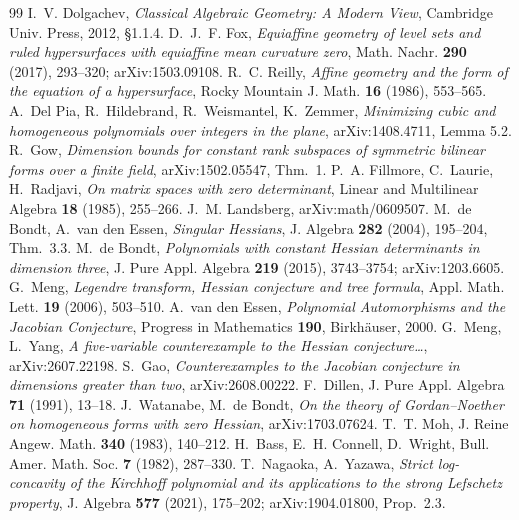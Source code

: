 \documentclass[11pt]{article}
\theoremstyle{plain}
\theoremstyle{definition}
\begin{document}
\begin{thebibliography}{99}
 I.~V. Dolgachev, \emph{Classical Algebraic Geometry: A
Modern View}, Cambridge Univ. Press, 2012, \S1.1.4.
 D.~J.~F. Fox, \emph{Equiaffine geometry of level sets and
ruled hypersurfaces with equiaffine mean curvature zero}, Math. Nachr.
\textbf{290} (2017), 293--320; arXiv:1503.09108.
 R.~C. Reilly, \emph{Affine geometry and the form of the
equation of a hypersurface}, Rocky Mountain J. Math. \textbf{16} (1986),
553--565.
 A.~Del Pia, R.~Hildebrand, R.~Weismantel, K.~Zemmer,
\emph{Minimizing cubic and homogeneous polynomials over integers in the
plane}, arXiv:1408.4711, Lemma 5.2.
 R.~Gow, \emph{Dimension bounds for constant rank subspaces of
symmetric bilinear forms over a finite field}, arXiv:1502.05547, Thm.~1.
 P.~A. Fillmore, C.~Laurie, H.~Radjavi, \emph{On matrix spaces
with zero determinant}, Linear and Multilinear Algebra \textbf{18} (1985),
255--266.
 J.~M. Landsberg, arXiv:math/0609507.
 M.~de Bondt, A.~van den Essen, \emph{Singular
Hessians}, J. Algebra \textbf{282} (2004), 195--204, Thm.~3.3.
 M.~de Bondt, \emph{Polynomials with constant Hessian
determinants in dimension three}, J. Pure Appl. Algebra \textbf{219}
(2015), 3743--3754; arXiv:1203.6605.
 G.~Meng, \emph{Legendre transform, Hessian conjecture and
tree formula}, Appl. Math. Lett. \textbf{19} (2006), 503--510.
 A.~van den Essen, \emph{Polynomial Automorphisms
and the Jacobian Conjecture}, Progress in Mathematics \textbf{190},
Birkh\"auser, 2000.
 G.~Meng, L.~Yang, \emph{A five-variable counterexample to
the Hessian conjecture\dots}, arXiv:2607.22198.
 S.~Gao, \emph{Counterexamples to the Jacobian conjecture in
dimensions greater than two}, arXiv:2608.00222.
 F.~Dillen, J. Pure Appl. Algebra \textbf{71} (1991),
13--18.
 J.~Watanabe, M.~de Bondt, \emph{On the theory of
Gordan--Noether on homogeneous forms with zero Hessian}, arXiv:1703.07624.
 T.~T. Moh, J. Reine Angew. Math. \textbf{340} (1983),
140--212.
 H.~Bass, E.~H. Connell, D.~Wright, Bull. Amer. Math. Soc.
\textbf{7} (1982), 287--330.
 T.~Nagaoka, A.~Yazawa, \emph{Strict log-concavity of the
Kirchhoff polynomial and its applications to the strong Lefschetz property},
J. Algebra \textbf{577} (2021), 175--202; arXiv:1904.01800, Prop.~2.3.
\end{thebibliography}
\end{document}
